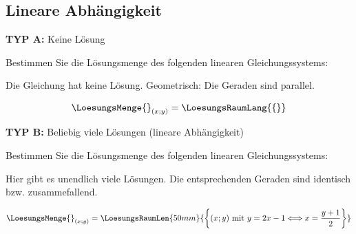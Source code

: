 %
%
\subsection{Lineare Abhängigkeit}

\textbf{TYP A:} Keine Lösung

Bestimmen Sie die Lösungsmenge des folgenden linearen Gleichungssystems:



Die Gleichung hat keine Lösung. Geometrisch: Die Geraden sind parallel.

$$\LoesungsMenge{}_{(x;y)} = \LoesungsRaumLang{\{\}}$$

\textbf{TYP B:} Beliebig viele Lösungen (lineare Abhängigkeit)


Bestimmen Sie die Lösungsmenge des folgenden linearen Gleichungssystems:



Hier gibt es unendlich viele Lösungen. Die entsprechenden Geraden sind
identisch bzw. zusammefallend.

$$\LoesungsMenge{}_{(x;y)} = \LoesungsRaumLen{50mm}{ \left\{(x;y) \text{ mit } y = 2x-1 \Longleftrightarrow x = \frac{y+1}2 \right\} }$$

\newpage


